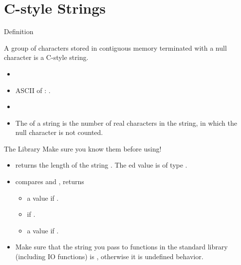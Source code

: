 \documentclass[handout]{beamer}
\begin{document}
\section{C-style Strings}

\begin{frame}{Definition}
    \begin{dfn}
        A group of characters stored in contiguous memory terminated with a null character  is a C-style string.
    \end{dfn}
    \pause
    \begin{itemize}
        \item {}
        \item ASCII of : .
        \item {}
        \item The  of a string is the number of real characters in the string, in which the null character is not counted.
    \end{itemize}
\end{frame}

\begin{frame}{The  Library}
    Make sure you know them before using!
    \begin{itemize}
        \item {} returns the length of the string . The ed value is of type .
        \pause
        \item {} compares  and  , returns
        \begin{itemize}
            \item a  value if .
            \item {} if .
            \item a  value if .
        \end{itemize}
        \pause
        \item Make sure that the string you pass to functions in the standard library (including IO functions) is , otherwise it is undefined behavior.
    \end{itemize}
\end{frame}
\end{document}
